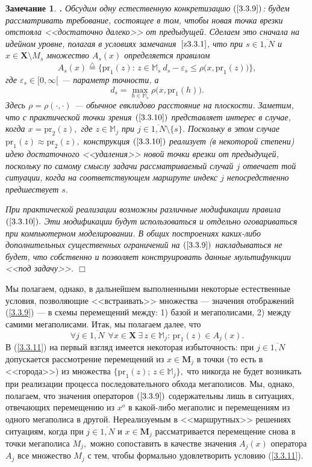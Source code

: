 \documentclass[11pt,twoside,openany]{report}
\newcommand{\bfn}{\begin{equation}}
\newcommand{\efn}{\end{equation}}
\newcommand{\df}{\stackrel{\triangle}{=}}
\newcommand{\ov}{\overline}
\newcounter{theo}
\newcounter{zam}
\newtheorem{zam}{Замечание}[section]
\newcommand{\TL}{\mbox{\bf{$\!\!$.}}}
\newcommand{\eps}{\varepsilon}
\newcommand{\sm}{\setminus}
\newcommand{\fa}{\forall}
\newcommand{\bbm}{{\mathbb M}}
\begin{document}
\begin{zam}\label{z3.3.2}{\TL}
 Обсудим одну естественную конкретизацию $(\ref{3.3.9})$: будем рассматривать
требование, состоящее в том, чтобы новая точка врезки отстояла <<достаточно далеко>>
от предыдущей. Сделаем это сначала на идейном уровне, полагая в условиях
замечания~$\ref{z3.3.1}$, что при $s\in \ov{1,N}$ и $x\in \mathbf{X}\sm M_s$
множество $A_s(x)$ определяется правилом
\bfn\label{3.3.10}A_s(x) \df \{\mathrm{pr}_1(z):\,z\in \bbm_s\
d_s -\eps_s\leqslant\rho\bigl(x,\mathrm{pr}_1(z)\bigl)\},
\efn
где $\eps_s\in [0,\infty[$ --- параметр точности, а
$$d_s = \max\limits_{h\in \bbm_s}\rho\bigl(x,\mathrm{pr}_1(h)\bigl).
$$
Здесь $\rho= \rho(\cdot,\cdot)$ --- обычное евклидово расстояние на
плоскости. Заметим, что с практической точки зрения $(\ref{3.3.10})$ представляет
интерес в случае, когда $x = \mathrm{pr}_2(z),$ где $z\in \bbm_j$ при $j\in
\ov{1,N}\sm \{s\}.$ Поскольку в этом случае $\mathrm{pr}_1(z)\approx \mathrm{pr}_2(z),$
конструкция $(\ref{3.3.10})$  реализует (в некоторой степени) идею достаточного
<<удаления>> новой точки врезки от предыдущей, поскольку по самому смыслу задачи
рассматриваемый случай $j$ отвечает той ситуации, когда на соответствующем маршруте
индекс $j$ непосредственно предшествует $s.$

При практической реализации возможны различные модификации правила $(\ref{3.3.10}).$
Эти модификации будут использоваться и отдельно оговариваться при компьютерном
моделировании. В общих построениях каких-либо дополнительных существенных ограничений
на $(\ref{3.3.9})$ накладываться не будет, что собственно и позволяет конструировать
данные мультифункции <<под задачу>>. \hfill $\Box$
\end{zam}

Мы полагаем, однако, в дальнейшем выполненными некоторые естественные условия,
позволяющие <<встраивать>> множества --- значения отображений (\ref{3.3.9}) ---
в схемы перемещений между: 1) базой и мегаполисами, 2) между самими мегаполисами.
Итак, мы полагаем далее, что
\bfn\label{3.3.11}\fa j\in\ov{1,N}\ \ \fa x \in \mathbf{X}\ \exists\, z\in
\bbm_j:\,\mathrm{pr}_1(z)\in A_j(x).
\efn
В (\ref{3.3.11}) на первый взгляд имеется некоторая избыточность: при $j\in\ov{1,N}$
допускается рассмотрение перемещений из $x\in \mathbf{M}_j$ в точки (то есть в
<<города>>) из множества $\{\mathrm{pr}_1(z);\, z\in \bbm_j\},$  что никогда не
будет возникать при реализации процесса последовательного обхода мегаполисов. Мы,
однако, полагаем, что значения операторов $(\ref{3.3.9})$ содержательны лишь в
ситуациях, отвечающих перемещению из $x^o$ в какой-либо мегаполис и перемещениям
из одного мегаполиса в другой. Нереализуемым в <<маршрутных>> решениях ситуациям,
когда при $j\in \ov{1,N}$ и $x\in \mathbf{M}_j$ рассматривается перемещение снова
в точки мегаполиса $M_j,$ можно сопоставить в качестве значения $A_j(x)$ оператора
$A_j$ все множество $M_j$ с тем, чтобы формально удовлетворить условию (\ref{3.3.11}).
\end{document}
